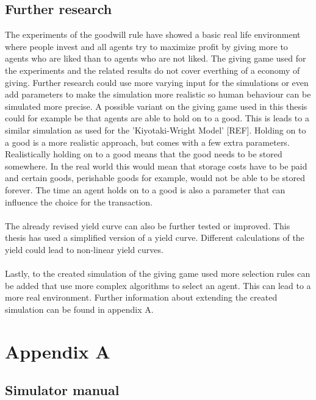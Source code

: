 \documentclass[twoside,openright]{uva-bachelor-thesis}
\begin{document}
\section{Further research}
The experiments of the goodwill rule have showed a basic real life environment where people invest and all agents try to maximize profit by giving more to agents who are liked than to agents who are not liked. The giving game used for the experiments and the related results do not cover everthing of a economy of giving. Further research could use more varying input for the simulations or even add parameters to make the simulation more realistic so human behaviour can be simulated more precise. A possible variant on the giving game used in this thesis could for example be that agents are able to hold on to a good. This is leads to a similar simulation as used for the 'Kiyotaki-Wright Model' [REF]. Holding on to a good is a more realistic approach, but comes with a few extra parameters. Realistically holding on to a good means that the good needs to be stored somewhere. In the real world this would mean that storage costs have to be paid and certain goods, perishable goods for example, would not be able to be stored forever. The time an agent holds on to a good is also a parameter that can influence the choice for the transaction.
\\
\\
The already revised yield curve can also be further tested or improved. This thesis has used a simplified version of a yield curve. Different calculations of the yield could lead to non-linear yield curves. \\
\\
Lastly, to the created simulation of the giving game used more selection rules can be added that use more complex algorithms to select an agent. This can lead to a more real environment. Further information about extending the created simulation can be found in appendix A.

\chapter{Appendix A}

\section{Simulator manual}
\end{document}
